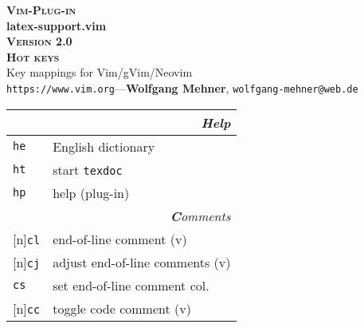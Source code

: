 \documentclass[oneside,10pt,landscape,DIV16]{scrartcl}
\newcommand{\Pluginversion}{2.0}
\newcommand{\Rep}{{\scriptsize{[n]}}}
\newcommand{\Map}[1] {\textbf{\textasciiacute}\texttt{#1}}
\begin{document}
\begin{multicols}{3}
\begin{center}
%
\textbf{\textsc{\small{Vim-Plug-in}}}\\
\textbf{\LARGE{latex-support.vim}}\\
\textbf{\textsc{\small{Version \Pluginversion}}}\\
\vspace{1mm}%
\textbf{\textsc{\Huge{Hot keys}}}\\
\vspace{1mm}%
Key mappings for Vim/gVim/Neovim\\
{\tiny  \texttt{https://www.vim.org}\hspace{1.5mm}---\hspace{1.5mm}\textbf{Wolfgang Mehner},  \texttt{wolfgang-mehner@web.de}}\\
\vspace{1.0mm}
%
\begin{tabular}[]{|p{11mm}|p{60mm}|}
\hline
\multicolumn{2}{|r|}{\textsl{\textbf{H}elp}}\\[1.0ex]
\hline \Map{he}   & English dictionary              \\
\hline \Map{ht}   & start \texttt{texdoc}           \\
\hline \Map{hp}   & help (plug-in)                  \\
\hline
\hline
\multicolumn{2}{|r|}{\textsl{\textbf{C}omments}}    \\[1.0ex]
\hline \Rep\Map{cl}   & end-of-line comment         \hfill (v)\\
\hline \Rep\Map{cj}   & adjust end-of-line comments \hfill (v)\\
\hline     \Map{cs}   & set end-of-line comment col.\\
%
\hline \Rep\Map{cc}   & toggle code comment         \hfill (v)\\

\end{tabular}
\end{center}
\end{multicols}
\end{document}
